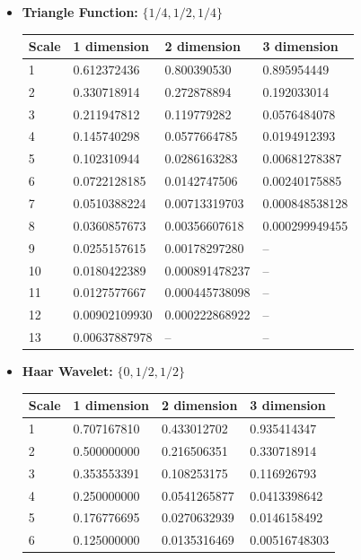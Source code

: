 \documentclass[12pt,a4paper]{article}
\begin{document}
\begin{itemize}
\item {\bf Triangle Function:} $\{1/4,1/2,1/4\}$

\begin{tabular}{llll}
Scale & 1 dimension      & 2 dimension     & 3 dimension\\ \hline
1     & 0.612372436      & 0.800390530     & 0.895954449  \\
2     & 0.330718914	 & 0.272878894     & 0.192033014\\
3     & 0.211947812	 & 0.119779282     & 0.0576484078\\
4     & 0.145740298	 & 0.0577664785    & 0.0194912393\\
5     & 0.102310944	 & 0.0286163283    & 0.00681278387\\
6     & 0.0722128185	 & 0.0142747506    & 0.00240175885\\
7     & 0.0510388224	 & 0.00713319703   & 0.000848538128 \\
8     & 0.0360857673	 & 0.00356607618   & 0.000299949455 \\
9     & 0.0255157615	 & 0.00178297280   & -- \\
10    & 0.0180422389	 & 0.000891478237  & --  \\
11    & 0.0127577667	 & 0.000445738098  & --  \\
12    & 0.00902109930	 & 0.000222868922  & --  \\
13    & 0.00637887978	 & --		   & -- \\

\end{tabular}

\item {\bf Haar Wavelet:} $\{0,1/2,1/2\}$

\begin{tabular}{llll}
Scale & 1 dimension      & 2 dimension     & 3 dimension\\ \hline
1     & 0.707167810      & 0.433012702     & 0.935414347 \\
2     & 0.500000000	 & 0.216506351     & 0.330718914\\
3     & 0.353553391	 & 0.108253175     & 0.116926793\\
4     & 0.250000000	 & 0.0541265877    & 0.0413398642\\
5     & 0.176776695	 & 0.0270632939    & 0.0146158492\\
6     & 0.125000000	 & 0.0135316469    & 0.00516748303

\end{tabular}


\end{itemize}
\end{document}
